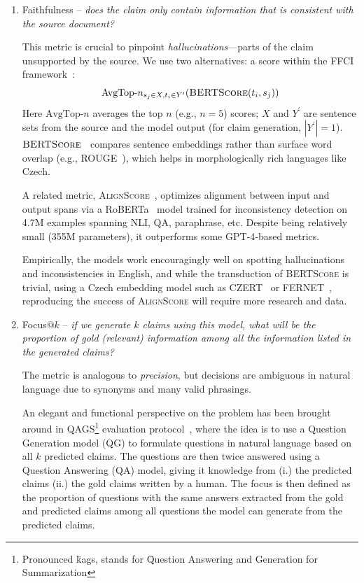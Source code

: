 \begin{enumerate}
    \item {\techbf Faithfulness} -- \textit{does the claim only contain information that is consistent with the source document?}
    
    This metric is crucial to pinpoint \textit{hallucinations}—parts of the claim unsupported by the source. We use two alternatives: a score within the FFCI framework~\cite{ffci}:
    $$\text{AvgTop-}n_{s_j\in X, t_i\in Y^\prime}(\textsc{BERTScore}(t_i,s_j))$$
    Here $\text{AvgTop-}n$ averages the top $n$ (e.g., $n{=}5$) scores; $X$ and $Y^\prime$ are sentence sets from the source and the model output (for claim generation, $|Y^\prime|{=}1$). $\textsc{BERTScore}$~\cite{bert-score} compares sentence embeddings rather than surface word overlap (e.g., ROUGE~\cite{lin-2004-rouge}), which helps in morphologically rich languages like Czech.

    A related metric, \textsc{AlignScore}~\cite{zha2023alignscore}, optimizes alignment between input and output spans via a RoBERTa~\cite{roberta} model trained for inconsistency detection on 4.7M examples spanning NLI, QA, paraphrase, etc. Despite being relatively small (355M parameters), it outperforms some GPT‑4‑based metrics.

    Empirically, the models work encouragingly well on spotting hallucinations and inconsistencies in English, and while the transduction of \textsc{BERTScore} is trivial, using a Czech embedding model such as CZERT~\cite{czert} or FERNET~\cite{fernet}, reproducing the success of \textsc{AlignScore} will require more research and data.

    \item {\techbf Focus}$@k$ -- \textit{if we generate $k$ claims using this model, what will be the proportion of gold (relevant) information among all the information listed in the generated claims?}
    
    The metric is analogous to \textit{precision}, but decisions are ambiguous in natural language due to synonyms and many valid phrasings.

    An elegant and functional perspective on the problem has been brought around in QAGS\footnote{Pronounced \"{kags}, stands for \"{Question Answering and Generation for Summarization}} evaluation protocol~\cite{wang-etal-2020-asking}, where the idea is to use a Question Generation model (QG) to formulate questions in natural language based on all $k$ predicted claims. The questions are then twice answered using a Question Answering (QA) model, giving it knowledge from (i.) the predicted claims (ii.) the gold claims written by a human.
    The focus is then defined as the proportion of questions with the same answers extracted from the gold and predicted claims among all questions the model can generate from the predicted claims. 


\end{enumerate}
